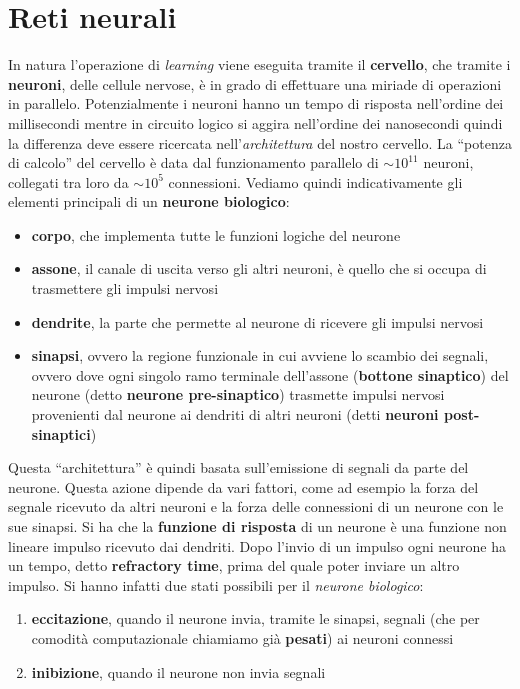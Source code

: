 \chapter{Reti neurali}
\label{Capitolo 4}

In natura l'operazione di \textit{learning} viene eseguita tramite il
\textbf{cervello}, che tramite i \textbf{neuroni}, delle cellule nervose, è in
grado di effettuare una miriade di operazioni in parallelo. Potenzialmente i
neuroni hanno un tempo di risposta nell'ordine dei millisecondi mentre in
circuito logico si aggira nell'ordine dei nanosecondi quindi la differenza deve
essere ricercata nell'\textit{architettura} del nostro cervello. La ``potenza di
calcolo'' del cervello è data dal funzionamento parallelo di $\sim 10^{11}$
neuroni, collegati tra loro da $\sim 10^5$ connessioni. Vediamo quindi
indicativamente gli elementi principali di un \textbf{neurone biologico}:
\begin{itemize}
	\item \textbf{corpo}, che implementa tutte le funzioni logiche del neurone
	\item \textbf{assone}, il canale di uscita verso gli altri neuroni, è quello
	      che si occupa di trasmettere gli impulsi nervosi
	\item \textbf{dendrite}, la parte che permette al neurone di ricevere gli
	      impulsi nervosi
	\item \textbf{sinapsi}, ovvero la regione funzionale in cui avviene lo scambio
	      dei segnali, ovvero dove ogni singolo ramo terminale dell'assone
	      (\textbf{bottone sinaptico}) del neurone (detto \textbf{neurone
	      pre-sinaptico}) trasmette impulsi nervosi provenienti dal neurone ai
	      dendriti di altri neuroni (detti \textbf{neuroni post-sinaptici})
\end{itemize}
Questa ``architettura'' è quindi basata sull'emissione di segnali da parte del
neurone. Questa azione dipende da vari fattori, come ad esempio la forza del
segnale ricevuto da altri neuroni e la forza delle connessioni di un neurone con
le sue sinapsi. Si ha che la \textbf{funzione di risposta} di un neurone è una
funzione non lineare impulso ricevuto dai dendriti. Dopo l'invio di un impulso
ogni neurone ha un tempo, detto \textbf{refractory time}, prima del quale poter
inviare un altro impulso. Si hanno infatti due stati possibili per il
\textit{neurone biologico}:
\begin{enumerate}
	\item \textbf{eccitazione}, quando il neurone invia, tramite le sinapsi,
	      segnali (che per comodità computazionale chiamiamo già \textbf{pesati}) ai
	      neuroni connessi
	\item \textbf{inibizione}, quando il neurone non invia segnali
\end{enumerate}
